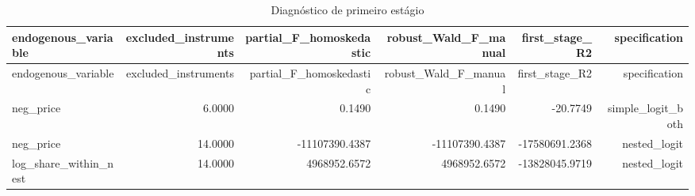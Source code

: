 \begingroup
\scriptsize
\begin{longtable}{@{}lrrrrr@{}}
\caption{Diagnóstico de primeiro estágio}\label{tab:first-stage}\\
\toprule
endogenous\_variable & excluded\_instruments & partial\_F\_homoskedastic & robust\_Wald\_F\_manual & first\_stage\_R2 & specification \\
\midrule
\endfirsthead
\toprule
endogenous\_variable & excluded\_instruments & partial\_F\_homoskedastic & robust\_Wald\_F\_manual & first\_stage\_R2 & specification \\
\midrule
\endhead
neg\_price & 6.0000 & 0.1490 & 0.1490 & -20.7749 & simple\_logit\_both \\
neg\_price & 14.0000 & -11107390.4387 & -11107390.4387 & -17580691.2368 & nested\_logit \\
log\_share\_within\_nest & 14.0000 & 4968952.6572 & 4968952.6572 & -13828045.9719 & nested\_logit \\
\bottomrule
\end{longtable}
\endgroup